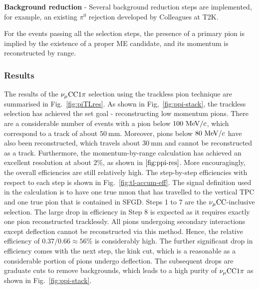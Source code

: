             \textbf{Background reduction} - Several background reduction steps are implemented, for example, an existing $\pi^0$ rejection developed by Colleagues at T2K.
        
            For the events passing all the selection steps, the presence of a primary pion is implied by the existence of a proper ME candidate, and its momentum is reconstructed by range. 
            
        
        \subsubsection{Results}
            The results of the $\nu_{\mu}\textrm{CC}1\pi$ selection using the trackless pion technique are summarised in Fig.~\ref{fig:piTLres}.
           As shown in Fig,~\ref{fig:ppi-stack}, the trackless selection has achieved the set goal - reconstructing low momentum pions. 
           There are a considerable number of events with a pion below $100~\textrm{MeV}/c$, which correspond to a track of about $50~\textrm{mm}$. 
           Moreover, pions below $80~\textrm{MeV}/c$ have also been reconstructed, which travels about $30~\textrm{mm}$ and cannot be reconstructed as a track. 
           Furthermore, the momentum-by-range calculation has achieved an excellent resolution at about $2\%$, as shown in $\ref{fig:ppi-res}$.
           More encouragingly, the overall efficiencies are still relatively high. 
           The step-by-step efficiencies with respect to each step is shown in Fig.~\ref{fig:tl-accum-eff}. 
           The signal definition used in the calculation is to have one true muon that has travelled to the vertical TPC and one true pion that is contained in SFGD. 
           Steps 1 to 7 are the $\nu_{\mu}\textrm{CC}$-inclusive selection. 
           The large drop in efficiency in Step 8 is expected as it requires exactly one pion reconstructed tracklessly. 
           All pions undergoing secondary interactions except deflection cannot be reconstructed via this method. 
           Hence, the relative efficiency of $0.37/0.66\approx56\%$ is considerably high. 
           The further significant drop in efficiency comes with the next step, the kink cut, which is a reasonable as a considerable portion of pions undergo deflection. 
           The subsequent drops are graduate cuts to remove backgrounds, which leads to a high purity of $\nu_{\mu}\textrm{CC}1\pi$ as shown in Fig.~\ref{fig:ppi-stack}.

